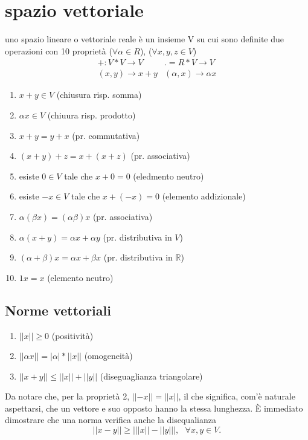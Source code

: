 \documentclass{book}
\newcommand{\abs}[1]{\lvert#1\rvert}
\begin{document}
\chapter{spazio vettoriale}
uno spazio lineare o vettoriale reale è un insieme V su cui sono definite due operazioni con 10 proprietà
($\forall \alpha \in R$), ($\forall x, y, z \in V$)
\begin{equation*}
  \begin{matrix}
    +:V*V\to V & .=R*V\to V\\
    (x,y) \to x + y & (\alpha,x) \to \alpha x
  \end{matrix}
\end{equation*}
\begin{enumerate}
    \item $x+y\in V$ (chiusura risp. somma)
    \item $\alpha x \in V$ (chiuura risp. prodotto)
    \item $x+y=y+x$ (pr. commutativa)
    \item $(x+y)+z=x+(x+z)$ (pr. associativa)
    \item esiste $0\in V$ tale che $x+0=0$ (eledmento neutro)
    \item esiste $-x \in V$ tale che $x+(-x)=0$ (elemento addizionale)
    \item $\alpha(\beta x)=(\alpha \beta) x$ (pr. associativa)
    \item $\alpha(x+y)=\alpha x+\alpha y$ (pr. distributiva in $V$)
    \item $(\alpha + \beta)x=\alpha x+\beta x$ (pr. distributiva in $\mathds{R}$)
    \item $1x=x$ (elemento neutro)
\end{enumerate}
\section{Norme vettoriali}
\begin{enumerate}
    \item $||x||\geq 0$ (positività)
    \item $||\alpha x||=|\alpha|*||x||$ (omogeneità)
    \item $||x+y||\leq||x||+||y||$ (diseguaglianza triangolare)
\end{enumerate}
Da notare che, per la proprietà 2, $\abs{\abs{-x}}=\abs{\abs{x}}$, il che significa, com'è naturale aspettarsi,
che un vettore e suo opposto hanno la stessa lunghezza. È immediato dimostrare che una norma verifica anche la
disequalianza
\begin{equation}
  \abs{|x-y|}\geq \abs{||x||-||y||},\text{ }\forall x,y\in V.
\end{equation}
  
\end{document}
